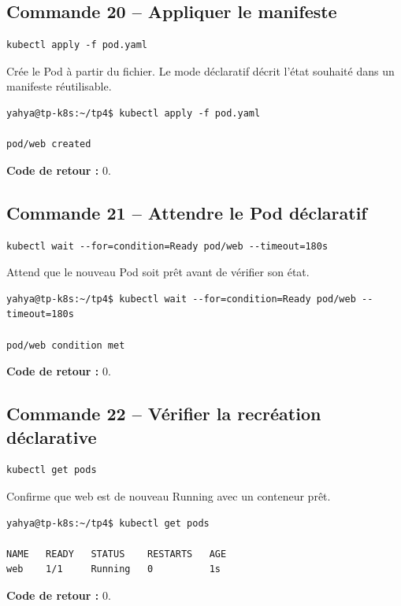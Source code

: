 \documentclass[11pt,a4paper]{article}
\begin{document}
\subsection{Commande 20 -- Appliquer le manifeste}
\begin{lstlisting}
kubectl apply -f pod.yaml
\end{lstlisting}
Crée le Pod à partir du fichier. Le mode déclaratif décrit l’état souhaité dans un manifeste réutilisable.
\begin{tcolorbox}[terminal,title={Ubuntu / WSL2 -- Commande 20 -- rendu reconstitué}]
\begin{Verbatim}[fontsize=\scriptsize,breaklines=true,breakanywhere=true,breaksymbolleft={},breaksymbolright={}]
yahya@tp-k8s:~/tp4$ kubectl apply -f pod.yaml

pod/web created
\end{Verbatim}
\end{tcolorbox}
\textbf{Code de retour :} 0.

\subsection{Commande 21 -- Attendre le Pod déclaratif}
\begin{lstlisting}
kubectl wait --for=condition=Ready pod/web --timeout=180s
\end{lstlisting}
Attend que le nouveau Pod soit prêt avant de vérifier son état.
\begin{tcolorbox}[terminal,title={Ubuntu / WSL2 -- Commande 21 -- rendu reconstitué}]
\begin{Verbatim}[fontsize=\scriptsize,breaklines=true,breakanywhere=true,breaksymbolleft={},breaksymbolright={}]
yahya@tp-k8s:~/tp4$ kubectl wait --for=condition=Ready pod/web --timeout=180s

pod/web condition met
\end{Verbatim}
\end{tcolorbox}
\textbf{Code de retour :} 0.

\subsection{Commande 22 -- Vérifier la recréation déclarative}
\begin{lstlisting}
kubectl get pods
\end{lstlisting}
Confirme que web est de nouveau Running avec un conteneur prêt.
\begin{tcolorbox}[terminal,title={Ubuntu / WSL2 -- Commande 22 -- rendu reconstitué}]
\begin{Verbatim}[fontsize=\scriptsize,breaklines=true,breakanywhere=true,breaksymbolleft={},breaksymbolright={}]
yahya@tp-k8s:~/tp4$ kubectl get pods

NAME   READY   STATUS    RESTARTS   AGE
web    1/1     Running   0          1s
\end{Verbatim}
\end{tcolorbox}
\textbf{Code de retour :} 0.
\end{document}
